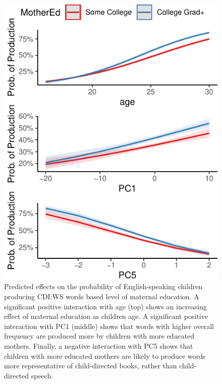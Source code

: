 \documentclass[10pt, letterpaper]{article}
\newenvironment{CodeChunk}{}{}
\begin{document}
\begin{CodeChunk}
\begin{figure}[t]

{\centering \includegraphics{figs/unnamed-chunk-12-1} 

}

\caption[Predicted effects on the probability of English-speaking children producing CDI:WS words based level of maternal education]{Predicted effects on the probability of English-speaking children producing CDI:WS words based level of maternal education. A significant positive interaction with age (top) shows an increasing effect of maternal education as children age. A significant positive interaction with PC1 (middle) shows that words with higher overall frequency are produced more by children with more educated mothers. Finally, a negative interaction with PC5 shows that children with more educated mothers are likely to produce words more representative of child-directed books, rather than child-directed speech.}\label{fig:unnamed-chunk-12}
\end{figure}
\end{CodeChunk}
\end{document}
